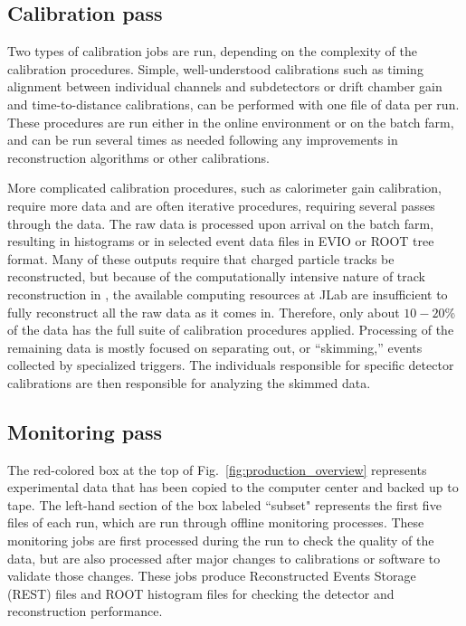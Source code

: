 \subsection{Calibration pass \label{sec:reccalibration}}

Two types of calibration jobs are run, depending on the complexity of the calibration procedures.  Simple, well-understood calibrations such as timing alignment between individual channels and subdetectors or drift chamber gain and time-to-distance calibrations, can be performed with one file of data per run.  These procedures are run either in the online environment or on the batch farm, and can be run several times as needed following any improvements in reconstruction algorithms or other calibrations.

More complicated calibration procedures, such as calorimeter gain calibration, require more data and are often iterative procedures, requiring several passes through the data.  The raw data is processed upon arrival on the batch farm, resulting in histograms or in selected event data files in EVIO or ROOT tree format.  Many of these outputs require that charged particle tracks be reconstructed, but because of the computationally intensive nature of track reconstruction in \GX, the available computing resources at JLab are insufficient to fully reconstruct all the raw data as it comes in.  Therefore, only about $10-20$\% of the data has the full suite of calibration procedures applied.  Processing of the remaining data is mostly focused on separating out, or ``skimming,'' events collected by specialized triggers. 
The individuals responsible for specific detector calibrations are then responsible for analyzing the skimmed data.

\subsection{Monitoring pass \label{sec:recmonitoring}}

The red-colored box at the top of Fig.~\ref{fig:production_overview} represents experimental data that has been copied to the computer center and backed up to tape. The left-hand section of the box labeled ``subset" represents the first five files of each run, which are run through offline monitoring processes. These monitoring jobs are first processed during the run to check the quality of the data, but are also processed after major changes to calibrations or software to validate those changes. These jobs produce Reconstructed Events Storage (REST) files and ROOT histogram files for checking the detector and reconstruction performance.

